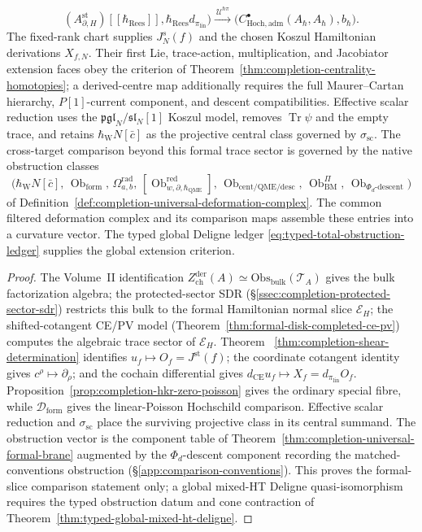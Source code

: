 \begin{thm}
\[    (A_{\partial,H}^{\mathrm{st}})
    [[\hbar_{\mathrm{Rees}}]],
    \hbar_{\mathrm{Rees}}d_{\pi_{\mathrm{lin}}}\bigr)
  \xrightarrow{\ \mathcal U^{\hbar\pi}\ }
  \bigl(C^\bullet_{\mathrm{Hoch},\mathrm{adm}}
    (A_\hbar,A_\hbar),b_\hbar\bigr).
\]
The fixed-rank chart supplies \(J_N^s(f)\) and the chosen Koszul
Hamiltonian derivations \(X_{f,N}\).  Their first Lie, trace-action,
multiplication, and Jacobiator extension faces obey the criterion of
Theorem~\ref{thm:completion-centrality-homotopies}; a derived-centre
map additionally requires the full Maurer--Cartan hierarchy,
\(P[1]\)-current component, and descent compatibilities.  Effective scalar
reduction uses the \(\mathfrak{pgl}_N/\mathfrak{sl}_N[1]\) Koszul
model, removes \(\operatorname{Tr}\psi\) and the empty trace, and
retains \(\hbar_{\mathrm W}N[\bar c]\) as the projective central
class governed by \(\sigma_{\mathrm{sc}}\).
The cross-target comparison beyond this formal trace sector is
governed by the native obstruction classes
\[
  \bigl(\hbar_{\mathrm{W}}N[\bar c],\,
   \operatorname{Ob}_{\mathrm{form}},\,
   \Omega^{\mathrm{rad}}_{a,b},\,
   [\operatorname{Ob}^{\mathrm{red}}_{w,\partial,\hbar_{\mathrm{QME}}}],\,
   \operatorname{Ob}_{\mathrm{cent/QME/desc}},\,
   \operatorname{Ob}^\Pi_{\mathrm{BM}},\,
   \operatorname{Ob}_{\Phi_d\text{-descent}}\bigr)
\]
of Definition~\ref{def:completion-universal-deformation-complex}.
The common filtered deformation complex and its comparison maps
assemble these entries into a curvature vector.  The typed global
Deligne ledger \eqref{eq:typed-total-obstruction-ledger} supplies the
global extension criterion.
\end{thm}

\begin{proof}
The Volume~II identification
\(Z^{\mathrm{der}}_{\mathrm{ch}}(A)\simeq
\mathrm{Obs}_{\mathrm{bulk}}(\mathcal T_A)\) gives the bulk
factorization algebra; the protected-sector SDR
(\S\ref{ssec:completion-protected-sector-sdr}) restricts this
bulk to the formal Hamiltonian normal slice \(\mathcal E_H\); the
shifted-cotangent CE/PV model
(Theorem~\ref{thm:formal-disk-completed-ce-pv}) computes the
algebraic trace sector of \(\mathcal E_H\).  Theorem~
\ref{thm:completion-shear-determination} identifies
\(u_f\mapsto O_f=J^{\mathrm{st}}(f)\); the coordinate cotangent
identity gives \(c^\rho\mapsto\partial_\rho\); and the cochain
differential gives
\(d_{\mathrm{CE}}u_f\mapsto
X_f=d_{\pi_{\mathrm{lin}}}O_f\).
Proposition~\ref{prop:completion-hkr-zero-poisson} gives the ordinary
special fibre, while \(\mathcal D_{\mathrm{form}}\) gives the
linear-Poisson Hochschild comparison.  Effective scalar reduction and
\(\sigma_{\mathrm{sc}}\) place the surviving projective class in its
central summand.  The obstruction vector is the
component table of
Theorem~\ref{thm:completion-universal-formal-brane} augmented by
the \(\Phi_d\)-descent component recording the matched-conventions
obstruction (\S\ref{app:comparison-conventions}).  This proves the
formal-slice comparison statement only; a global mixed-HT Deligne
quasi-isomorphism requires the typed obstruction datum and cone
contraction of Theorem~\ref{thm:typed-global-mixed-ht-deligne}.
\end{proof}

